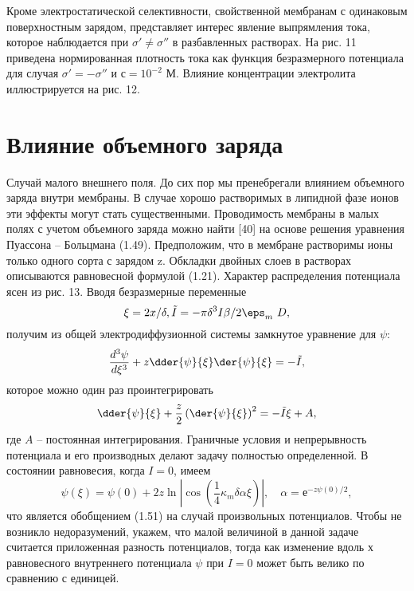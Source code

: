 Кроме электростатической селективности, свойственной мембранам с одинаковым
поверхностным зарядом, представляет интерес явление выпрямления тока, которое
наблюдается при \( \sigma' \neq \sigma'' \) в разбавленных растворах. На рис. 11
приведена нормированная плотность тока как функция безразмерного потенциала для
случая \( \sigma' = -\sigma'' \) и \( с = 10^{-2} \) М. Влияние концентрации
электролита иллюстрируется на рис. 12.

\section{Влияние объемного заряда}
Случай малого внешнего поля. До сих пор мы пренебрегали влиянием объемного
заряда внутри мембраны. В случае хорошо растворимых в липидной фазе ионов эти
эффекты могут стать существенными. Проводимость мембраны в малых полях с учетом
объемного заряда можно найти [40] на основе решения уравнения
Пуассона -- Больцмана (1.49). Предположим, что в мембране растворимы ионы только
одного сорта с зарядом z. Обкладки двойных слоев в растворах описываются
равновесной формулой (1.21). Характер распределения потенциала ясен из рис. 13.
Вводя безразмерные переменные
\[
    \xi = 2x/\delta, \tilde{I} = -\pi\delta^3I\beta/2\eps_m\ D,
\]
получим из общей электродиффузионной системы замкнутое уравнение для \( \psi \):
\begin{equation}
    \frac{d^3\psi}{d\xi^3} + z\dder{\psi}{\xi}\der{\psi}{\xi} = -\tilde{I},
\end{equation}
которое можно один раз проинтегрировать
\[
    \dder{\psi}{\xi} + \frac{z}{2}\left(\der{\psi}{\xi}\right)^2 =
        -\tilde{I}\xi + A,
\]
где \( A \) -- постоянная интегрирования.
Граничные условия и непрерывность потенциала и его производных делают задачу
полностью определенной. В состоянии равновесия, когда \( I = 0 \), имеем
\begin{equation}
    \psi(\xi) = \psi(0) +
        2z\ln|\cos\left(\frac{1}{4}\kappa_m\delta\alpha\xi\right)|,\quad
        \alpha = е^{-z\psi(0)/2},
\end{equation}
что является обобщением (1.51) на случай произвольных потенциалов. Чтобы не
возникло недоразумений, укажем, что малой величиной в данной задаче считается
приложенная разность потенциалов, тогда как изменение вдоль х равновесного
внутреннего потенциала \( \psi \) при \( I = 0 \) может быть велико по сравнению
с единицей.


